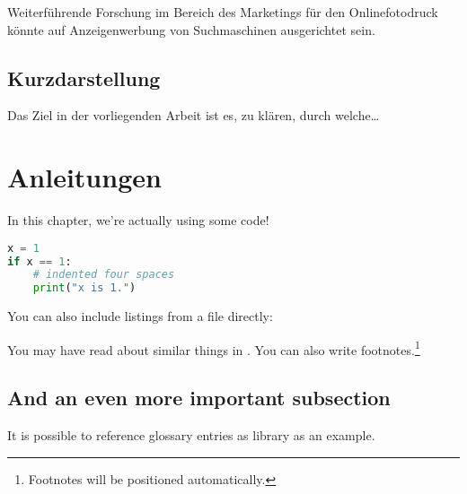Weiterführende Forschung im Bereich des Marketings für den Onlinefotodruck könnte auf Anzeigenwerbung von Suchmaschinen ausgerichtet sein.

\subsection{Kurzdarstellung}
Das Ziel in der vorliegenden Arbeit ist es, zu klären, durch welche\dots


\section{Anleitungen}
In this chapter, we're actually using some code!

\begin{lstlisting}[language=Python,caption={This is an example of inline listing},captionpos=b]
x = 1
if x == 1:
    # indented four spaces
    print("x is 1.")

\end{lstlisting}

You can also include listings from a file directly:



\thispagestyle{empty}
You may have read about similar things in \cite{Goodliffe2007}.
You can also write footnotes.\footnote{Footnotes will be positioned automatically.}




\subsection{And an even more important subsection}

It is possible to reference glossary entries as \gls{library} as an example.
